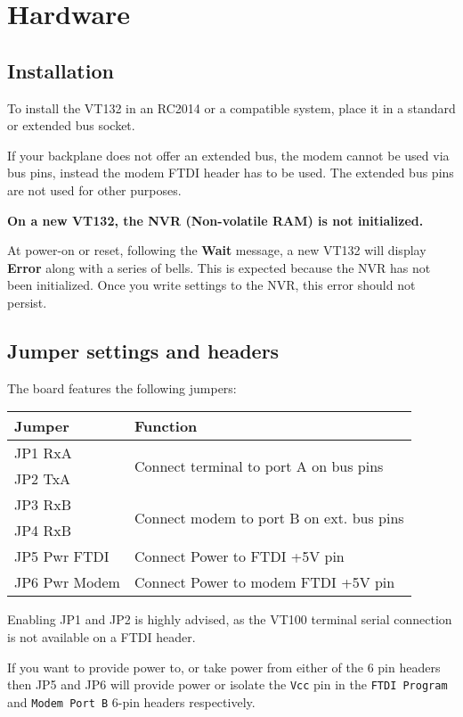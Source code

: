 \appendix

\chapter{Hardware}

\section{Installation}

To install the VT132 in an RC2014 or a compatible system, place it in a standard or extended bus socket.

If your backplane does not offer an extended bus, the modem cannot be used via bus pins, instead the modem FTDI header has to be used.
The extended bus pins are not used for other purposes.

\textbf{On a new VT132, the NVR (Non-volatile RAM) is not initialized.}

At power-on or reset, following the \textbf{Wait} message, a new VT132 will display \textbf{Error} along with a series of bells.
This is expected because the NVR has not been initialized.
Once you write settings to the NVR, this error should not persist.

\section{Jumper settings and headers}
\label{jumperheaders}

The board features the following jumpers:

\begin{tabular}{p{7em} | p{}}
\hline
\textbf{Jumper} & \textbf{Function} \\
\hline
JP1 RxA & \multirow{2}{*}{Connect terminal to port A on bus pins} \\
JP2 TxA \\
\hline
JP3 RxB & \multirow{2}{*}{Connect modem to port B on ext. bus pins} \\
JP4 RxB \\
\hline
JP5 Pwr FTDI & Connect Power to FTDI +5V pin \\
\hline
JP6 Pwr Modem & Connect Power to modem FTDI +5V pin \\
\hline
\end{tabular}

Enabling JP1 and JP2 is highly advised, as the VT100 terminal serial connection is not available on a FTDI header.

If you want to provide power to, or take power from either of the 6 pin headers then JP5 and JP6 will provide power
or isolate the \texttt{Vcc} pin in the \texttt{FTDI Program} and \texttt{Modem Port B} 6-pin headers respectively.

